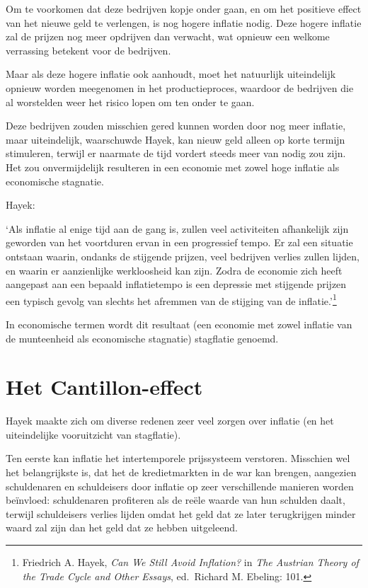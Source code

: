 \documentclass[
  a5paper,
  smalldemyvopaper,11pt,twoside,onecolumn,openright,extrafontsizes,
hidelinks]{memoir}
\renewenvironment{quote}%
               {\list{}{\rightmargin=.3cm\leftmargin=.3cm}%
                \itshape \item[]}%
               {\endlist}
\begin{document}
Om te voorkomen dat deze bedrijven kopje onder gaan, en om het positieve
effect van het nieuwe geld te verlengen, is nog hogere inflatie nodig.
Deze hogere inflatie zal de prijzen nog meer opdrijven dan verwacht, wat
opnieuw een welkome verrassing betekent voor de bedrijven.

Maar als deze hogere inflatie ook aanhoudt, moet het natuurlijk
uiteindelijk opnieuw worden meegenomen in het productieproces, waardoor
de bedrijven die al worstelden weer het risico lopen om ten onder te
gaan.

Deze bedrijven zouden misschien gered kunnen worden door nog meer
inflatie, maar uiteindelijk, waarschuwde Hayek, kan nieuw geld alleen op
korte termijn stimuleren, terwijl er naarmate de tijd vordert steeds
meer van nodig zou zijn. Het zou onvermijdelijk resulteren in een
economie met zowel hoge inflatie als economische stagnatie.

Hayek:

\begin{quote}
`Als inflatie al enige tijd aan de gang is, zullen veel activiteiten
afhankelijk zijn geworden van het voortduren ervan in een progressief
tempo. Er zal een situatie ontstaan waarin, ondanks de stijgende
prijzen, veel bedrijven verlies zullen lijden, en waarin er aanzienlijke
werkloosheid kan zijn. Zodra de economie zich heeft aangepast aan een
bepaald inflatietempo is een depressie met stijgende prijzen een typisch
gevolg van slechts het afremmen van de stijging van de
inflatie.'\footnote{\hspace{0pt}Friedrich A. Hayek, \emph{Can We Still
  Avoid Inflation?} in \emph{The Austrian Theory of the Trade Cycle and
  Other Essays}, ed.~Richard M. Ebeling: 101.}
\end{quote}

In economische termen wordt dit resultaat (een economie met zowel
inflatie van de munteenheid als economische stagnatie) stagflatie
genoemd.

\section{Het Cantillon-effect}\label{het-cantillon-effect}

Hayek maakte zich om diverse redenen zeer veel zorgen over inflatie (en
het uiteindelijke vooruitzicht van stagflatie).

Ten eerste kan inflatie het intertemporele prijssysteem verstoren.
Misschien wel het belangrijkste is, dat het de kredietmarkten in de war
kan brengen, aangezien schuldenaren en schuldeisers door inflatie op
zeer verschillende manieren worden beïnvloed: schuldenaren profiteren
als de reële waarde van hun schulden daalt, terwijl schuldeisers verlies
lijden omdat het geld dat ze later terugkrijgen minder waard zal zijn
dan het geld dat ze hebben uitgeleend.
\end{document}
